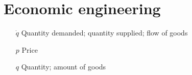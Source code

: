 \section*{Economic engineering}
\begin{itemize}[itemsep=0pt, leftmargin=2cm, labelsep=0cm, labelwidth=1.9cm, align=left]
%
    \item[$\dot{q}$] Quantity demanded; quantity supplied; flow of goods
    \item[$p$] Price
    \item[$q$] Quantity; amount of goods
%
%
%
\end{itemize}